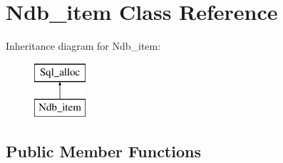 \hypertarget{classNdb__item}{}\section{Ndb\+\_\+item Class Reference}
\label{classNdb__item}
Inheritance diagram for Ndb\+\_\+item\+:\begin{figure}[H]
\begin{center}
\leavevmode
\includegraphics[height=2.000000cm]{classNdb__item}
\end{center}
\end{figure}
\subsection*{Public Member Functions}
